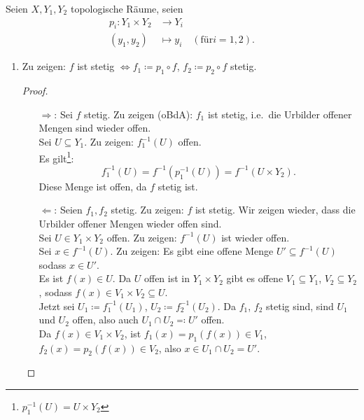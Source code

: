 \begin{problem}[2]
  Seien \( X, Y_1, Y_2 \) topologische Räume, seien
  \begin{align*}
    p_i: Y_1 \times Y_2 &\to Y_i \\
    (y_1, y_2) &\mapsto y_i \quad (\text{für} i = 1,2)\text{.}
  \end{align*}
  \begin{enumerate}
    \item Zu zeigen: \( f \) ist stetig \( \Leftrightarrow f_1 \coloneqq p_1 \circ f \), \( f_2 \coloneqq p_2 \circ f \) stetig. \\
    \begin{proof}
      \ 
      \begin{itemize}
        \item[\( \Rightarrow \):] Sei \( f \) stetig. Zu zeigen (oBdA): \( f_1 \) ist stetig, i.e.\ die Urbilder offener Mengen sind wieder offen. \\
        Sei \( U \subseteq Y_1 \). Zu zeigen: \( f_1^{-1}(U) \) offen. \\
        Es gilt\footnote{\( p_1^{-1}(U) = U \times Y_2 \)}:
        \begin{equation*}
          f_1^{-1}(U) = f^{-1}(p_1^{-1}(U)) = f^{-1}(U \times Y_2)\text{.}
        \end{equation*}
        Diese Menge ist offen, da \( f \) stetig ist.
        \item[\( \Leftarrow \):] Seien \( f_1, f_2 \) stetig. Zu zeigen: \( f \) ist stetig. Wir zeigen wieder, dass die Urbilder offener Mengen wieder offen sind. \\
        Sei \( U \in Y_1 \times Y_2 \) offen. Zu zeigen: \( f^{-1}(U) \) ist wieder offen. \\
        Sei \( x \in f^{-1}(U) \). Zu zeigen: Es gibt eine offene Menge \( U' \subseteq f^{-1}(U) \) sodass \( x \in U' \). \\
        Es ist \( f(x) \in U \). Da \( U \) offen ist in \( Y_1 \times Y_2 \) gibt es offene \( V_1 \subseteq Y_1 \), \( V_2 \subseteq Y_2 \), sodass \( f( x) \in V_1 \times V_2 \subseteq U \). \\
        Jetzt sei \( U_1 \coloneqq f_1^{-1}(U_1) \), \( U_2 \coloneqq f_2^{-1}(U_2) \). Da \( f_1 \), \( f_2 \) stetig sind, sind \( U_1 \) und \( U_2 \) offen, also auch \( U_1 \cap U_2 \eqqcolon U' \) offen. \\
        Da \( f( x) \in V_1 \times V_2 \), ist \( f_1( x) = p_1(f(x)) \in V_1 \), \( f_2(x) = p_2(f(x)) \in V_2 \), also \( x \in U_1 \cap U_2 = U' \).
      \end{itemize}
    \end{proof}
    

\end{enumerate}
\end{problem}
